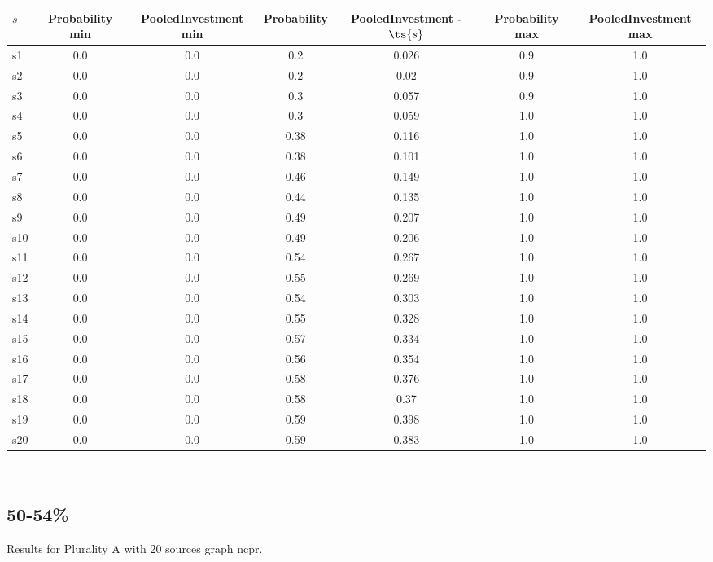 \documentclass{article}
\begin{document}
\noindent\begin{tabular}{|l|c|c|c|c|c|c|}
\hline
$s$& Probability min & PooledInvestment min & Probability & PooledInvestment - $\ts{s}$ & Probability max & PooledInvestment max\\
\hline
s1 &0.0 & 0.0 & 0.2 & 0.026 & 0.9 & 1.0\\
\hline
s2 &0.0 & 0.0 & 0.2 & 0.02 & 0.9 & 1.0\\
\hline
s3 &0.0 & 0.0 & 0.3 & 0.057 & 0.9 & 1.0\\
\hline
s4 &0.0 & 0.0 & 0.3 & 0.059 & 1.0 & 1.0\\
\hline
s5 &0.0 & 0.0 & 0.38 & 0.116 & 1.0 & 1.0\\
\hline
s6 &0.0 & 0.0 & 0.38 & 0.101 & 1.0 & 1.0\\
\hline
s7 &0.0 & 0.0 & 0.46 & 0.149 & 1.0 & 1.0\\
\hline
s8 &0.0 & 0.0 & 0.44 & 0.135 & 1.0 & 1.0\\
\hline
s9 &0.0 & 0.0 & 0.49 & 0.207 & 1.0 & 1.0\\
\hline
s10 &0.0 & 0.0 & 0.49 & 0.206 & 1.0 & 1.0\\
\hline
s11 &0.0 & 0.0 & 0.54 & 0.267 & 1.0 & 1.0\\
\hline
s12 &0.0 & 0.0 & 0.55 & 0.269 & 1.0 & 1.0\\
\hline
s13 &0.0 & 0.0 & 0.54 & 0.303 & 1.0 & 1.0\\
\hline
s14 &0.0 & 0.0 & 0.55 & 0.328 & 1.0 & 1.0\\
\hline
s15 &0.0 & 0.0 & 0.57 & 0.334 & 1.0 & 1.0\\
\hline
s16 &0.0 & 0.0 & 0.56 & 0.354 & 1.0 & 1.0\\
\hline
s17 &0.0 & 0.0 & 0.58 & 0.376 & 1.0 & 1.0\\
\hline
s18 &0.0 & 0.0 & 0.58 & 0.37 & 1.0 & 1.0\\
\hline
s19 &0.0 & 0.0 & 0.59 & 0.398 & 1.0 & 1.0\\
\hline
s20 &0.0 & 0.0 & 0.59 & 0.383 & 1.0 & 1.0\\
\hline
\end{tabular}\\

\newpage

\subsection{50-54\%}

\noindent Results for Plurality A with 20 sources graph ncpr.
\end{document}

